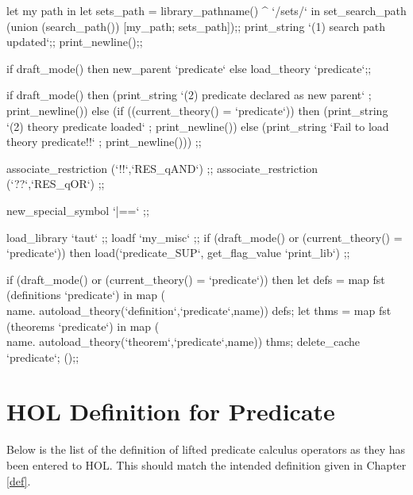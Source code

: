 \endcode
{}
\endmoddef
let \LA{}my path\RA{} in
let sets_path = library_pathname() ^ `/sets/` in
set_search_path (union (search_path()) [my_path; sets_path]);;
print_string `(1) search path updated`;; print_newline();;

\endcode
{}
\endmoddef
if draft_mode() 
   then new_parent `predicate` else load_theory `predicate`;;

if draft_mode()
   then (print_string `(2) predicate declared as new parent` ;
         print_newline())
   else (if ((current_theory() = `predicate`))
         then (print_string `(2) theory predicate loaded` ;
               print_newline())
         else (print_string `Fail to load theory predicate!!` ;
               print_newline())) ;;

\endcode
{}
\endmoddef
associate_restriction (`!!`,`RES_qAND`) ;;
associate_restriction (`??`,`RES_qOR`) ;;

\endcode
{}
\endmoddef
new_special_symbol `|==` ;;

\endcode
{}
\endmoddef
load_library `taut` ;;
loadf `my_misc` ;;
if (draft_mode() or (current_theory() = `predicate`)) 
   then load(`predicate_SUP`, get_flag_value `print_lib`) ;;

\endcode
{}
\endmoddef
if (draft_mode() or (current_theory() = `predicate`)) then
   let defs = map fst (definitions `predicate`) in
       map (\\name. autoload_theory(`definition`,`predicate`,name)) defs;
   let thms = map fst (theorems `predicate`) in
       map (\\name. autoload_theory(`theorem`,`predicate`,name)) thms; 
   delete_cache `predicate`; ();;

\endcode
{}

\chapter{HOL Definition for Predicate}
\label{HOL def}

Below is the list of the definition of lifted predicate calculus
operators as they has been entered to HOL. This should match the
intended definition given in Chapter \ref{def}.

\enddocs
{}
\endmoddef

